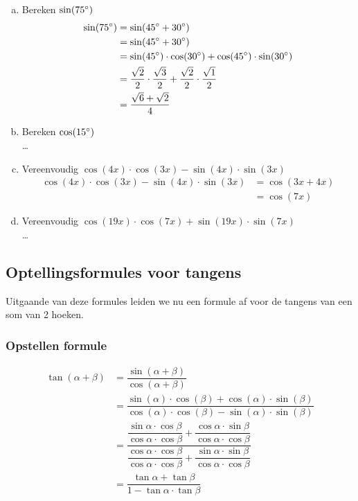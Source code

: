 \documentclass[a4paper,12pt]{article}
\begin{document}
\begin{enumerate}[(a)]
  \item Bereken $\sin(75^\circ)$
  \begin{align*}
    \sin(75^\circ)&=\sin(45^\circ+30^\circ)\\
                   &=\sin(45^\circ+30^\circ)\\
                   &=\sin(45^\circ)\cdot \cos(30^\circ)+\cos(45^\circ)\cdot \sin(30^\circ)\\
                   &=\frac{\sqrt{2}}{2}\cdot \frac{\sqrt{3}}{2}+\frac{\sqrt{2}}{2}\cdot\frac{\sqrt{1}}{2}\\
                   &=\frac{\sqrt{6}+\sqrt{2}}{4}
  \end{align*}
  \item Bereken $\cos(15^\circ)$
  \\\ldots
  \item Vereenvoudig $\cos(4x)\cdot \cos(3x)-\sin(4x)\cdot \sin(3x)$
  \begin{align*}
    \cos(4x)\cdot \cos(3x)-\sin(4x)\cdot \sin(3x)&=\cos(3x+4x)\\
                                                 &=\cos(7x)
  \end{align*}
  \item Vereenvoudig $\cos(19x)\cdot \cos(7x)+\sin(19x)\cdot \sin(7x)$
  \\\ldots
\end{enumerate}

\pagebreak
\subsection{Optellingsformules voor tangens}
Uitgaande van deze formules leiden we nu een formule af voor de tangens van een som van 2 hoeken.

\subsubsection*{Opstellen formule}
\begin{align*}
  \tan(\alpha + \beta) &= \dfrac{\sin(\alpha + \beta)}{\cos(\alpha+\beta)}\\
                       &= \dfrac{\sin(\alpha)\cdot \cos(\beta)+\cos(\alpha)\cdot \sin(\beta)}{\cos(\alpha)\cdot \cos(\beta)-\sin(\alpha)\cdot \sin(\beta)}\\
                       &= \dfrac{\dfrac{\sin\alpha\cdot\cos\beta}{\cos\alpha\cdot\cos\beta}+\dfrac{\cos\alpha\cdot\sin\beta}{\cos\alpha\cdot\cos\beta}}{\dfrac{\cos\alpha\cdot\cos\beta}{\cos\alpha\cdot\cos\beta}+\dfrac{\sin\alpha\cdot\sin\beta}{\cos\alpha\cdot\cos\beta}}\\
                       &= \dfrac{\tan\alpha+\tan\beta}{1-\tan\alpha\cdot\tan\beta}
\end{align*}
\end{document}
